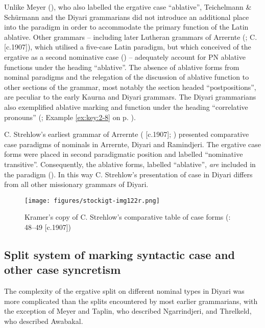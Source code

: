 Unlike Meyer (), who also labelled the ergative case “ablative'', Teichelmann \& Schürmann and the Diyari grammarians did not introduce an additional place into the paradigm in order to accommodate the primary function of the Latin ablative. Other grammars -- including later Lutheran grammars of Arrernte (\citealt{kempe_grammar_1891}; C. \citealt{strehlow_untitled_1931} [c.1907]), which utilised a five-case Latin paradigm, but which conceived of the ergative as a second nominative case () -- adequately account for PN ablative functions under the heading “ablative''. The absence of ablative forms from nominal paradigms and the relegation of the discussion of ablative function to other sections of the grammar, most notably the section headed “postpositions'', are peculiar to the early Kaurna and Diyari grammars. The Diyari grammarians also exemplified ablative marking and function under the heading “correlative pronouns” (; Example \ref{ex:key:2-8} on p. \pageref{ex:key:2-8}).

C. Strehlow’s earliest grammar of Arrernte (\citeyear{strehlow_untitled_1931} [c.1907]; ) presented comparative case paradigms of nominals in Arrernte, Diyari and Ramindjeri. The ergative case forms were placed in second paradigmatic position and labelled ``nominative transitive''. Consequently, the ablative forms, labelled “ablative”, \textit{are} included in the paradigm (). In this way C. Strehlow’s presentation of case in Diyari differs from all other missionary grammars of Diyari.

\begin{figure}
\texttt{[image: figures/stockigt-img122r.png]}
\caption{Kramer’s copy of C. Strehlow's comparative table of case forms (\citeyear{strehlow_untitled_1931}: 48--49 [c.1907])}
\label{bkm:Ref456019058}\label{fig:key:8-173}
\end{figure}

\subsection{Split system of marking syntactic case and other case syncretism}
\label{sec:key:8.6.2}

The complexity of the ergative split on different nominal types in Diyari was more complicated than the splits encountered by most earlier grammarians, with the exception of Meyer and Taplin, who described Ngarrindjeri, and Threlkeld, who described Awabakal.

